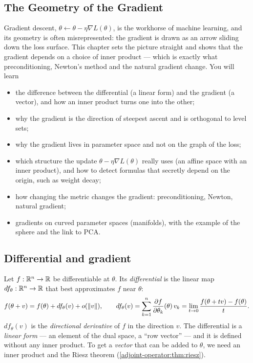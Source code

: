 \begin{notechapter}
\chapter{The Geometry of the Gradient}\label{ch:gradient-tangent-space}\label{ch:gradient-misconception}

\begin{chapterintro}
Gradient descent, $\theta\leftarrow\theta - \eta\nabla L(\theta)$, is the workhorse of machine learning, and
its geometry is often misrepresented: the gradient is drawn as an arrow sliding down the loss
surface. This chapter sets the picture straight and shows that the gradient depends on a
choice of inner product --- which is exactly what preconditioning, Newton's method and the
natural gradient change. You will learn
\begin{itemize}[nosep]
  \item the difference between the differential (a linear form) and the gradient (a vector),
        and how an inner product turns one into the other;
  \item why the gradient is the direction of steepest ascent and is orthogonal to level sets;
  \item why the gradient lives in parameter space and not on the graph of the loss;
  \item which structure the update $\theta - \eta\nabla L(\theta)$ really uses (an affine space with an inner product),
        and how to detect formulas that secretly depend on the origin, such as weight decay;
  \item how changing the metric changes the gradient: preconditioning, Newton, natural gradient;
  \item gradients on curved parameter spaces (manifolds), with the example of the sphere and the
        link to PCA.
\end{itemize}
\end{chapterintro}

\section{Differential and gradient}\label{gradient-tangent-space:sec:differential}

Let $f:\mathbb{R}^n\to\mathbb{R}$ be differentiable at $\theta$. Its \emph{differential} is the linear map
$df_\theta:\mathbb{R}^n\to\mathbb{R}$ that best approximates $f$ near $\theta$:
\[
  f(\theta + v) = f(\theta) + df_\theta(v) + o(\left\|v\right\|),\qquad
  df_\theta(v) = \sum_{k=1}^n\frac{\partial f}{\partial\theta_k}(\theta)\,v_k
  = \lim_{t\to0}\frac{f(\theta + tv) - f(\theta)}{t} .
\]
$df_\theta(v)$ is the \emph{directional derivative} of $f$ in the direction $v$. The differential is a
\emph{linear form} --- an element of the dual space, a ``row vector'' --- and it is defined without any
inner product. To get a \emph{vector} that can be added to $\theta$, we need an inner product and the
Riesz theorem (\cref{adjoint-operator:thm:riesz}).


\end{notechapter}
